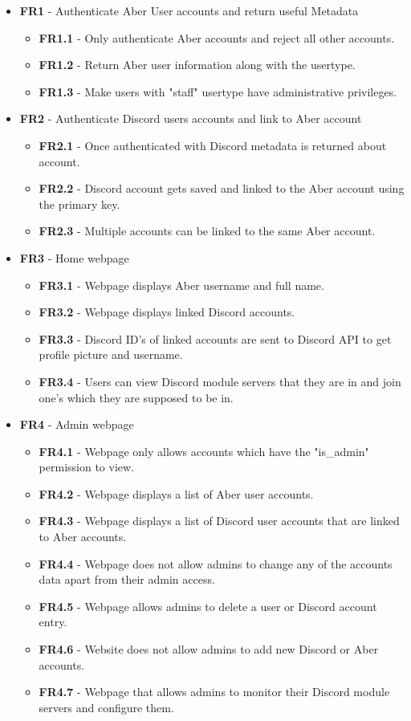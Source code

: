 \begin{itemize}
	\item \textbf{FR1} - Authenticate Aber User accounts and return useful Metadata
	\begin{itemize}
		\item \textbf{FR1.1} - Only authenticate Aber accounts and reject all other accounts.
		\item \textbf{FR1.2} - Return Aber user information along with the usertype.
		\item \textbf{FR1.3} - Make users with "staff" usertype have administrative privileges.
	\end{itemize}

	\item \textbf{FR2} - Authenticate Discord users accounts and link to Aber account
	\begin{itemize}
		\item \textbf{FR2.1} - Once authenticated with Discord metadata is returned about account.
		\item \textbf{FR2.2} - Discord account gets saved and linked to the Aber account using the primary key.
		\item \textbf{FR2.3} - Multiple accounts can be linked to the same Aber account.
	\end{itemize}

	\item \textbf{FR3} - Home webpage
	\begin{itemize}
		\item \textbf{FR3.1} - Webpage displays Aber username and full name.
		\item \textbf{FR3.2} - Webpage displays linked Discord accounts.
		\item \textbf{FR3.3} - Discord ID's of linked accounts are sent to Discord API to get profile picture and username.
		\item \textbf{FR3.4} - Users can view Discord module servers that they are in and join one's which they are supposed to be in.
	\end{itemize}

	\item \textbf{FR4} - Admin webpage
	\begin{itemize}
		\item \textbf{FR4.1} - Webpage only allows accounts which have the "is\_admin" permission to view.
		\item \textbf{FR4.2} - Webpage displays a list of Aber user accounts.
		\item \textbf{FR4.3} - Webpage displays a list of Discord user accounts that are linked to Aber accounts.
		\item \textbf{FR4.4} - Webpage does not allow admins to change any of the accounts data apart from their admin access.
		\item \textbf{FR4.5} - Webpage allows admins to delete a user or Discord account entry.
		\item \textbf{FR4.6} - Website does not allow admins to add new Discord or Aber accounts.
		\item \textbf{FR4.7} - Webpage that allows admins to monitor their Discord module servers and configure them.
	\end{itemize}


\end{itemize}
